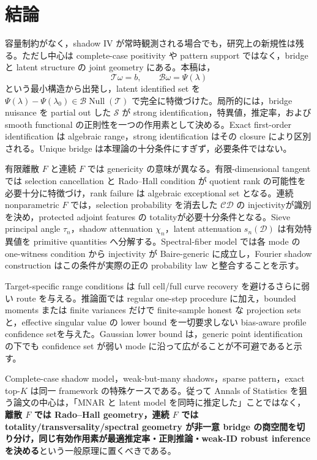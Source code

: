 \documentclass[11pt,a4paper]{ltjsarticle}
\theoremstyle{remark}
\newcommand{\Top}{\mathscr T}
\newcommand{\Bop}{\mathscr B}
\newcommand{\Sop}{\mathscr S}
\newcommand{\Cop}{\mathscr C}
\newcommand{\Jcal}{\mathscr D}
\newcommand{\Null}{\operatorname{Null}}
\begin{document}
\section{結論}\label{sec:conclusion}
容量制約がなく，shadow IV が常時観測される場合でも，研究上の新規性は残る。ただし中心は complete-case positivity や pattern support ではなく，bridge と latent structure の joint geometry にある。本稿は，
\[
\Top\omega=b,
\qquad
\Bop\omega=\Psi(\lambda)
\]
という最小構造から出発し，latent identified set を $\Psi(\lambda)-\Psi(\lambda_0)\in\Bop\Null(\Top)$ で完全に特徴づけた。局所的には，bridge nuisance を partial out した $\Sop$ が strong identification，特異値，推定率，および smooth functional の正則性を一つの作用素として決める。Exact first-order identification は algebraic range，strong identification はその closure により区別される。Unique bridge は本理論の十分条件にすぎず，必要条件ではない。

有限離散 $F$ と連続 $F$ では genericity の意味が異なる。有限-dimensional tangent では selection cancellation と Rado--Hall condition が quotient rank の可能性を必要十分に特徴づけ，rank failure は algebraic exceptional set となる。連続 nonparametric $F$ では，selection probability を消去した $\Cop\Jcal$ の injectivityが識別を決め，protected adjoint features の totalityが必要十分条件となる。Sieve principal angle $\tau_n$，shadow attenuation $\chi_n$，latent attenuation $s_n(\Jcal)$ は有効特異値を primitive quantities へ分解する。Spectral-fiber model では各 mode の one-witness condition から injectivity が Baire-generic に成立し，Fourier shadow construction はこの条件が実際の正の probability law と整合することを示す。

Target-specific range conditions は full cell/full curve recovery を避けるさらに弱い route を与える。推論面では regular one-step procedure に加え，bounded moments または finite variances だけで finite-sample honest な projection sets と，effective singular value の lower bound を一切要求しない bias-aware profile confidence setを与えた。Gaussian lower bound は，generic point identification の下でも confidence set が弱い mode に沿って広がることが不可避であると示す。

Complete-case shadow model，weak-but-many shadows，sparse pattern，exact top-$K$ は同一 framework の特殊ケースである。従って Annals of Statistics を狙う論文の中心は，「MNAR と latent model を同時に推定した」ことではなく，\textbf{離散 $F$ では Rado--Hall geometry，連続 $F$ では totality/transversality/spectral geometry が非一意 bridge の商空間を切り分け，同じ有効作用素が最適推定率・正則推論・weak-ID robust inference を決める}という一般原理に置くべきである。
\end{document}
